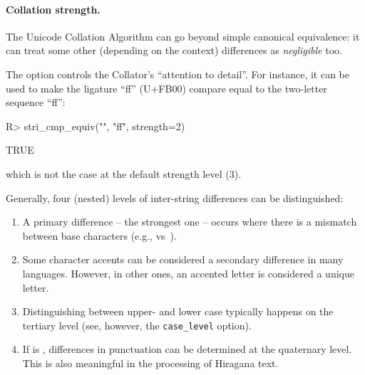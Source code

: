\documentclass[nojss]{jss}
\begin{document}
\paragraph{Collation strength.}
The Unicode Collation Algorithm \citep{uts10:collation}
can go beyond simple canonical equivalence:
it can treat some other (depending on the context)
differences as \textit{negligible} too.

The  option controls the Collator's ``attention to detail''.
For instance, it can be used to make the ligature ``ff'' (U+FB00)
compare equal to the two-letter sequence ``f{}f'':

\begin{Schunk}
\begin{Sinput}
R> stri_cmp_equiv("", "ff", strength=2)
\end{Sinput}
\begin{Soutput}
[1] TRUE
\end{Soutput}
\end{Schunk}

\noindent
which is not the case at the default strength level (3).




Generally, four (nested) levels of inter-string differences can be distinguished:
\begin{enumerate}
\item A primary difference -- the strongest one -- occurs where
there is a mismatch between base characters (e.g.,  vs~).

\item Some character accents can be considered a secondary difference
in many languages. However, in other ones, an accented letter is considered
a unique letter.

\item Distinguishing between upper- and lower case typically happens
on the tertiary level (see, however, the \texttt{case\_level} option).


\item If  is ,
differences in punctuation
can be determined at the quaternary level. This is also meaningful
in the processing of Hiragana text.


\end{enumerate}
\end{document}
